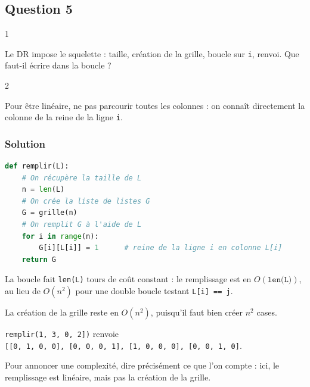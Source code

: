 \documentclass[11pt,a4paper]{article}
\begin{document}
\hypertarget{question-5}{%
\subsection{Question 5}\label{question-5}}

\begin{indication}{1}

Le DR impose le squelette : taille, création de la grille, boucle sur \texttt{i}, renvoi. Que faut-il écrire dans la boucle ?

\end{indication}

\begin{indication}{2}

Pour être linéaire, ne pas parcourir toutes les colonnes : on connaît directement la colonne de la reine de la ligne \texttt{i}.

\end{indication}

\hypertarget{solution-4}{%
\subsubsection{Solution}\label{solution-4}}

\begin{lstlisting}[language=Python]
def remplir(L):
    # On récupère la taille de L
    n = len(L)
    # On crée la liste de listes G
    G = grille(n)
    # On remplit G à l'aide de L
    for i in range(n):
        G[i][L[i]] = 1      # reine de la ligne i en colonne L[i]
    return G
\end{lstlisting}

La boucle fait \texttt{len(L)} tours de coût constant : le remplissage est en \(O(\texttt{len(L)})\), au lieu de \(O(n^2)\) pour une double boucle testant \texttt{L{[}i{]}\ ==\ j}.

La création de la grille reste en \(O(n^2)\), puisqu'il faut bien créer \(n^2\) cases.

\texttt{remplir(\allowbreak{}{[}1,\allowbreak{}\ 3,\allowbreak{}\ 0,\allowbreak{}\ 2{]}\allowbreak{})\allowbreak{}} renvoie \texttt{{[}{[}0,\allowbreak{}\ 1,\allowbreak{}\ 0,\allowbreak{}\ 0{]}\allowbreak{},\allowbreak{}\ {[}0,\allowbreak{}\ 0,\allowbreak{}\ 0,\allowbreak{}\ 1{]}\allowbreak{},\allowbreak{}\ {[}1,\allowbreak{}\ 0,\allowbreak{}\ 0,\allowbreak{}\ 0{]}\allowbreak{},\allowbreak{}\ {[}0,\allowbreak{}\ 0,\allowbreak{}\ 1,\allowbreak{}\ 0{]}\allowbreak{}{]}\allowbreak{}}.

\begin{methode}

Pour annoncer une complexité, dire précisément ce que l'on compte : ici, le remplissage est linéaire, mais pas la création de la grille.

\end{methode}
\end{document}
